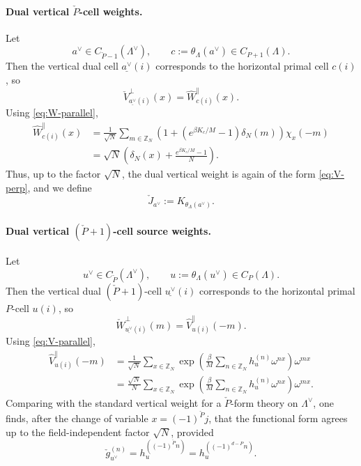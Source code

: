 \paragraph{Dual vertical \(\check P\)-cell weights.}
Let
\begin{equation}
a^\vee\in C_{\check P-1}(\Lambda^\vee),
\qquad
c:=\theta_\Lambda(a^\vee)\in C_{P+1}(\Lambda).
\end{equation}
Then the vertical dual cell \(\underline{a^\vee}(i)\) corresponds to the horizontal primal
cell \(c(i)\), so
\begin{equation}
	\check V_{\underline{a^\vee}(i)}^{\perp}(x)
	=
	\widehat W_{c(i)}^{\parallel}(x).
\end{equation}
Using \eqref{eq:W-parallel},
\begin{align}
	\widehat W_{c(i)}^{\parallel}(x)
	&=
	\frac{1}{\sqrt N}\sum_{m\in \mathbb Z_N}
	\left(
	1+\left(e^{\beta K_c/M}-1\right)\delta_N(m)
	\right)\chi_x(-m)
	\nonumber\\
	&=
	\sqrt N
	\left(
	\delta_N(x)+\frac{e^{\beta K_c/M}-1}{N}
	\right).
	\label{eq:KW-dual-vertical-V-explicit}
\end{align}
Thus, up to the factor \(\sqrt N\), the dual vertical weight is again of the form
\eqref{eq:V-perp}, and we define
\begin{equation}
	\check J_{a^\vee}:=K_{\theta_\Lambda(a^\vee)}.
	\label{eq:KW-dual-J-def}
\end{equation}

\paragraph{Dual vertical \((\check P+1)\)-cell source weights.}
Let
\begin{equation}
u^\vee\in C_{\check P}(\Lambda^\vee),
\qquad
u:=\theta_\Lambda(u^\vee)\in C_P(\Lambda).
\end{equation}
Then the vertical dual \((\check P+1)\)-cell \(\underline{u^\vee}(i)\) corresponds to the
horizontal primal \(P\)-cell \(u(i)\), so
\begin{equation}
	\check W_{\underline{u^\vee}(i)}^{\perp}(m)
	=
	\widehat V_{u(i)}^{\parallel}(-m).
\end{equation}
Using \eqref{eq:V-parallel},
\begin{align}
	\widehat V_{u(i)}^{\parallel}(-m)
	&=
	\frac{1}{\sqrt N}\sum_{x\in \mathbb Z_N}
	\exp \left(\frac{\beta}{M}\sum_{n\in\mathbb Z_N}h_u^{(n)}\omega^{nx}\right)\omega^{mx}
	\nonumber\\
	&=
	\frac{\sqrt N}{N}\sum_{x\in \mathbb Z_N}
	\exp \left(\frac{\beta}{M}\sum_{n\in\mathbb Z_N}h_u^{(n)}\omega^{nx}\right)\omega^{mx}.
	\label{eq:KW-dual-vertical-W-first}
\end{align}
Comparing with the standard vertical weight for a \(\check P\)-form theory on
\(\Lambda^\vee\), one finds, after the change of variable \(x=(-1)^{\check P}j\), that the
functional form agrees up to the field-independent factor \(\sqrt N\), provided
\begin{equation}
	\check g_{u^\vee}^{(n)}
	=
	h_{u}^{((-1)^{\check P}n)}
	=
	h_{u}^{((-1)^{d-P}n)}.
	\label{eq:KW-dual-g-def}
\end{equation}


